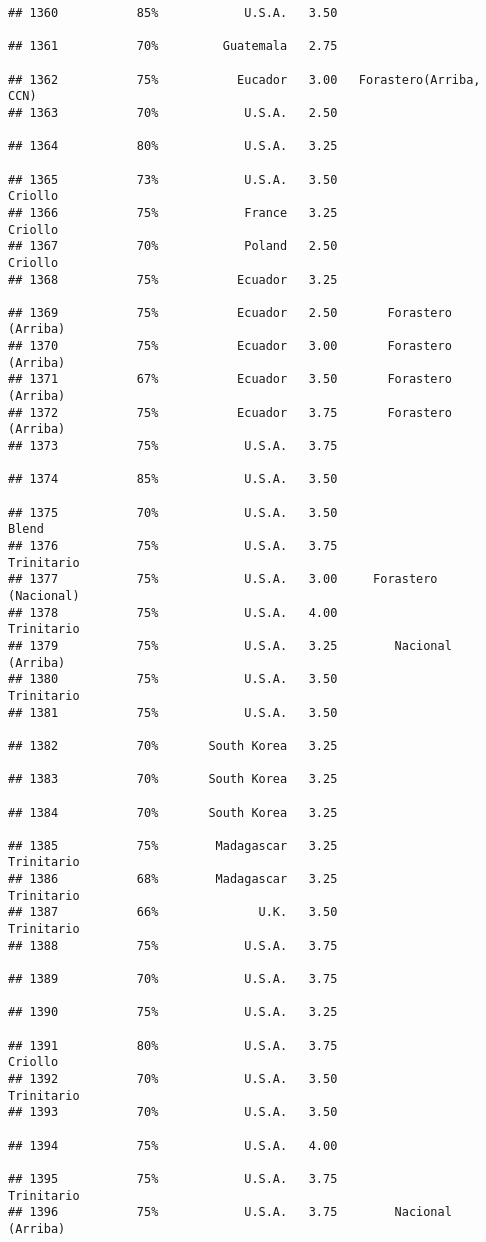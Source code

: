 \documentclass[
]{article}
\begin{document}
\begin{verbatim}
## 1360           85%            U.S.A.   3.50                         
## 1361           70%         Guatemala   2.75                         
## 1362           75%           Eucador   3.00   Forastero(Arriba, CCN)
## 1363           70%            U.S.A.   2.50                         
## 1364           80%            U.S.A.   3.25                         
## 1365           73%            U.S.A.   3.50                  Criollo
## 1366           75%            France   3.25                  Criollo
## 1367           70%            Poland   2.50                  Criollo
## 1368           75%           Ecuador   3.25                         
## 1369           75%           Ecuador   2.50       Forastero (Arriba)
## 1370           75%           Ecuador   3.00       Forastero (Arriba)
## 1371           67%           Ecuador   3.50       Forastero (Arriba)
## 1372           75%           Ecuador   3.75       Forastero (Arriba)
## 1373           75%            U.S.A.   3.75                         
## 1374           85%            U.S.A.   3.50                         
## 1375           70%            U.S.A.   3.50                    Blend
## 1376           75%            U.S.A.   3.75               Trinitario
## 1377           75%            U.S.A.   3.00     Forastero (Nacional)
## 1378           75%            U.S.A.   4.00               Trinitario
## 1379           75%            U.S.A.   3.25        Nacional (Arriba)
## 1380           75%            U.S.A.   3.50               Trinitario
## 1381           75%            U.S.A.   3.50                         
## 1382           70%       South Korea   3.25                         
## 1383           70%       South Korea   3.25                         
## 1384           70%       South Korea   3.25                         
## 1385           75%        Madagascar   3.25               Trinitario
## 1386           68%        Madagascar   3.25               Trinitario
## 1387           66%              U.K.   3.50               Trinitario
## 1388           75%            U.S.A.   3.75                         
## 1389           70%            U.S.A.   3.75                         
## 1390           75%            U.S.A.   3.25                         
## 1391           80%            U.S.A.   3.75                  Criollo
## 1392           70%            U.S.A.   3.50               Trinitario
## 1393           70%            U.S.A.   3.50                         
## 1394           75%            U.S.A.   4.00                         
## 1395           75%            U.S.A.   3.75               Trinitario
## 1396           75%            U.S.A.   3.75        Nacional (Arriba)

\end{verbatim}
\end{document}
